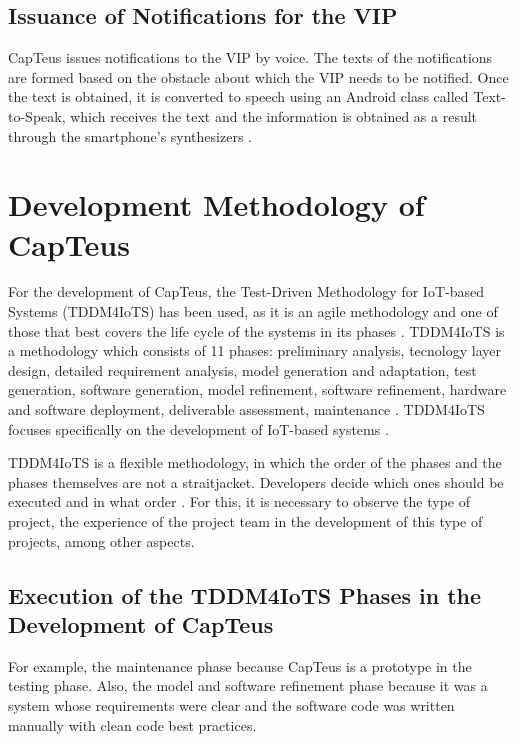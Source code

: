 \documentclass{svproc}
\begin{document}
\subsection{Issuance of Notifications for the VIP}

CapTeus issues notifications to the VIP by voice. The texts of the notifications
are formed based on the obstacle about which the VIP needs to be notified.
Once the text is obtained, it is converted to speech using an Android class called
Text-to-Speak, which receives the text and the information is obtained as a result
through the smartphone’s synthesizers \cite{Tufan2022}.

\section{Development Methodology of CapTeus}

For the development of CapTeus, the Test-Driven Methodology for IoT-based
Systems (TDDM4IoTS) \cite{Guerrero-Ulloa2020} has been used, as it is an agile methodology and
one of those that best covers the life cycle of the systems in its phases \cite{Guerrero-Ulloa2023}.
TDDM4IoTS is a methodology which consists of 11 phases: preliminary analysis,
tecnology layer design, detailed requirement analysis, model generation and
adaptation, test generation, software generation, model refinement, software refinement,
hardware and software deployment, deliverable assessment, maintenance
\cite{Guerrero-Ulloa2020}. TDDM4IoTS focuses specifically on the development of IoT-based
systems \cite{Guerrero-Ulloa2020,Guerrero-Ulloa2023}.

TDDM4IoTS is a flexible methodology, in which the order of the phases and
the phases themselves are not a straitjacket. Developers decide which ones should
be executed and in what order \cite{Guerrero-Ulloa2020}. For this, it is necessary to observe the type of project, the experience of the project team in the development of this type of
projects, among other aspects.

\subsection{Execution of the TDDM4IoTS Phases in the Development of CapTeus}

For example, the maintenance phase because CapTeus is a prototype in the testing
phase. Also, the model and software refinement phase because it was a system
whose requirements were clear and the software code was written manually with
clean code best practices.
\end{document}
